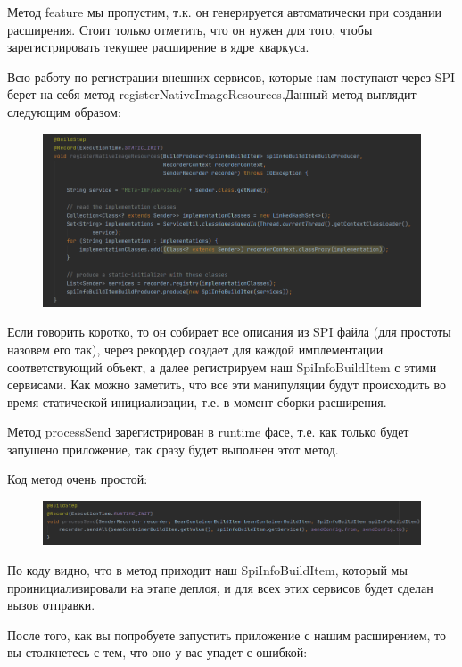 \documentclass[russian,11pt]{article}
\begin{document}
Метод feature мы пропустим, т.к. он генерируется автоматически при создании расширения. Стоит только отметить, что он нужен для того, чтобы зарегистрировать текущее расширение в ядре кваркуса.

Всю работу по регистрации внешних сервисов, которые нам поступают через SPI берет на себя метод registerNativeImageResources.Данный метод выглядит следующим образом:

\begin{figure}[H]
	\centering
	\includegraphics[width=\textwidth]{19}
\end{figure}

Если говорить коротко, то он собирает все описания из SPI файла (для простоты назовем его так), через рекордер создает для каждой имплементации соответствующий объект, а далее регистрируем наш SpiInfoBuildItem с этими сервисами. Как можно заметить, что все эти манипуляции будут происходить во время статической инициализации, т.е. в момент сборки расширения.

Метод processSend зарегистрирован в runtime фасе, т.е. как только будет запушено приложение, так сразу будет выполнен этот метод.

\newpage
Код метод очень простой:

\begin{figure}[H]
	\centering
	\includegraphics[width=\textwidth]{20}
\end{figure}

По коду видно, что в метод приходит наш SpiInfoBuildItem, который мы проинициализировали на этапе деплоя, и для всех этих сервисов будет сделан вызов отправки.

После того, как вы попробуете запустить приложение с нашим расширением, то вы столкнетесь с тем, что оно у вас упадет с ошибкой:
\end{document}
